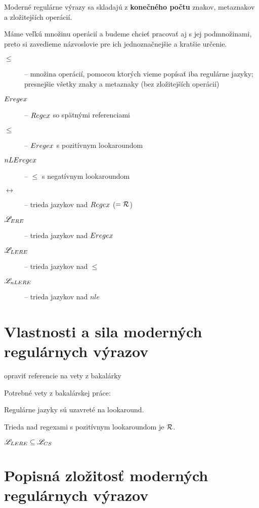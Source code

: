 Moderné regulárne výrazy sa skladajú z \textbf{konečného počtu} znakov, metaznakov a zložitejších operácií.

Máme veľkú množinu operácií a budeme chcieť pracovať aj s jej podmnožinami, preto si zavedieme názvoslovie pre ich jednoznačnejšie a kratšie určenie.

\begin{description}
\item[$\le$] -- množina operácií, pomocou ktorých vieme popísať iba regulárne jazyky; presnejšie všetky znaky a metaznaky (bez zložitejších operácií)
\item[$Eregex$] -- $Regex$ so spätnými referenciami
\item[$\le$] -- $Eregex$ s pozitívnym lookaroundom
\item[$nLEregex$] -- $\le$ s negatívnym lookaroundom
\item[$\rel$] -- trieda jazykov nad $Regex$ ($= {\cal R}$)
\item[$\mathscr{L}_{ERE}$] -- trieda jazykov nad $Eregex$
\item[$\mathscr{L}_{LERE}$] -- trieda jazykov nad $\le$
\item[$\mathscr{L}_{nLERE}$] -- trieda jazykov nad $nle$
\end{description}

\section[Vlastnosti a sila]{Vlastnosti a sila moderných regulárnych výrazov}
\label{usila}

\todo opraviť referencie na vety z bakalárky

Potrebné vety z bakalárskej práce:

\begin{veta}[Veta 2.2.5.]\label{lookahead+R}
Regulárne jazyky sú uzavreté na lookaround.
\end{veta}

\begin{veta}[Veta 2.2.10.]\label{lookaround+R}
Trieda nad regexami s pozitívnym lookaroundom je ${\cal R}$.
\end{veta} 

\begin{veta}[Veta 2.2.14.]\label{le+lcs}
$ \mathscr{L}_{LERE} \subseteq \mathscr{L}_{CS} $
\end{veta}

\section[Popisná zložitosť]{Popisná zložitosť moderných regulárnych výrazov}
\label{uzlozitost}


